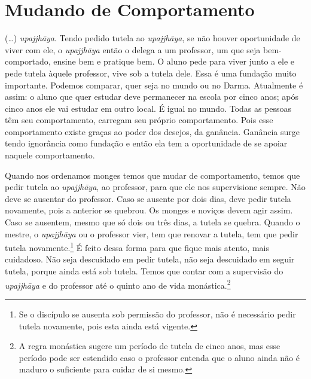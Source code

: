 
\chapter{Mudando de Comportamento}
\markright{\theChapterAuthor}

(…) \textit{upajjhāya}. Tendo pedido tutela ao
\textit{upajjhāya}, se não houver oportunidade de viver com ele, o
\textit{upajjhāya} então o delega a um professor, um que seja
bem-comportado, ensine bem e pratique bem. O aluno pede para viver
junto a ele e pede tutela àquele professor, vive sob a tutela dele.
Essa é uma fundação muito importante. Podemos comparar, quer seja no
mundo ou no Darma. Atualmente é assim: o aluno que quer estudar deve
permanecer na escola por cinco anos; após cinco anos ele vai estudar em
outro local. É igual no mundo. Todas as pessoas têm seu comportamento,
carregam seu próprio comportamento. Pois esse comportamento existe
graças ao poder dos desejos, da ganância. Ganância surge tendo
ignorância como fundação e então ela tem a oportunidade de se apoiar
naquele comportamento. 

Quando nos ordenamos monges temos que mudar de comportamento, temos
que pedir tutela ao \textit{upajjhāya}, ao professor, para que ele
nos supervisione sempre. Não deve se ausentar do professor. Caso se
ausente por dois dias, deve pedir tutela novamente, pois a anterior se
quebrou. Os monges e noviços devem agir assim. Caso se ausentem, mesmo
que só dois ou três dias, a tutela se quebra. Quando o mestre, o
\textit{upajjhāya} ou o professor vier, tem que renovar a tutela, tem
que pedir tutela novamente.\footnote{Se o discípulo se ausenta sob
permissão do professor, não é necessário pedir tutela novamente, pois
esta ainda está vigente.} É feito dessa forma para que fique mais
atento, mais cuidadoso. Não seja descuidado em pedir tutela, não seja
descuidado em seguir tutela, porque ainda está sob tutela. Temos que
contar com a supervisão do \textit{upajjhāya} e do professor até o
quinto ano de vida monástica.\footnote{A regra monástica sugere um
período de tutela de cinco anos, mas esse período pode ser estendido
caso o professor entenda que o aluno ainda não é maduro o suficiente
para cuidar de si mesmo.} 

